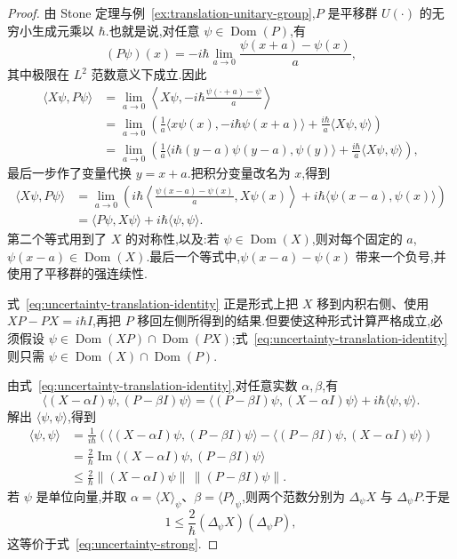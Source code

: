 \begin{proof}
由 Stone 定理与例~\ref{ex:translation-unitary-group},$P$ 是平移群 $U(\cdot)$ 的无穷小生成元乘以 $\hbar$.也就是说,对任意 $\psi\in\operatorname{Dom}(P)$,有
\[
(P\psi)(x)=-i\hbar\lim_{a\to0}\frac{\psi(x+a)-\psi(x)}{a},
\]
其中极限在 $L^2$ 范数意义下成立.因此
\begin{align}
\langle X\psi,P\psi\rangle
&=\lim_{a\to0}\left\langle X\psi,-i\hbar\frac{\psi(\cdot+a)-\psi}{a}\right\rangle\\
&=\lim_{a\to0}\left(\frac1a\langle x\psi(x),-i\hbar\psi(x+a)\rangle
+\frac{i\hbar}{a}\langle X\psi,\psi\rangle\right)\\
&=\lim_{a\to0}\left(\frac1a\langle i\hbar(y-a)\psi(y-a),\psi(y)\rangle
+\frac{i\hbar}{a}\langle X\psi,\psi\rangle\right),
\end{align}
最后一步作了变量代换 $y=x+a$.把积分变量改名为 $x$,得到
\begin{align}
\langle X\psi,P\psi\rangle
&=\lim_{a\to0}\left(i\hbar\left\langle\frac{\psi(x-a)-\psi(x)}a,X\psi(x)\right\rangle
+i\hbar\langle\psi(x-a),\psi(x)\rangle\right)\\
&=\langle P\psi,X\psi\rangle+i\hbar\langle\psi,\psi\rangle.
\label{eq:uncertainty-translation-identity}
\end{align}
第二个等式用到了 $X$ 的对称性,以及:若 $\psi\in\operatorname{Dom}(X)$,则对每个固定的 $a$,$\psi(x-a)\in\operatorname{Dom}(X)$.最后一个等式中,$\psi(x-a)-\psi(x)$ 带来一个负号,并使用了平移群的强连续性.

式~\eqref{eq:uncertainty-translation-identity} 正是形式上把 $X$ 移到内积右侧、使用 $XP-PX=i\hbar I$,再把 $P$ 移回左侧所得到的结果.但要使这种形式计算严格成立,必须假设 $\psi\in\operatorname{Dom}(XP)\cap\operatorname{Dom}(PX)$;式~\eqref{eq:uncertainty-translation-identity} 则只需 $\psi\in\operatorname{Dom}(X)\cap\operatorname{Dom}(P)$.

由式~\eqref{eq:uncertainty-translation-identity},对任意实数 $\alpha,\beta$,有
\[
\langle (X-\alpha I)\psi,(P-\beta I)\psi\rangle
=\langle(P-\beta I)\psi,(X-\alpha I)\psi\rangle+i\hbar\langle\psi,\psi\rangle.
\label{eq:uncertainty-shifted-inner-product}
\]
解出 $\langle\psi,\psi\rangle$,得到
\begin{align}
\langle\psi,\psi\rangle
&=\frac1{i\hbar}\left(\langle(X-\alpha I)\psi,(P-\beta I)\psi\rangle
-\langle(P-\beta I)\psi,(X-\alpha I)\psi\rangle\right)\\
&=\frac2\hbar\operatorname{Im}\langle(X-\alpha I)\psi,(P-\beta I)\psi\rangle\\
&\leq\frac2\hbar\|(X-\alpha I)\psi\|\,\|(P-\beta I)\psi\|.
\label{eq:uncertainty-strong-cauchy}
\end{align}
若 $\psi$ 是单位向量,并取 $\alpha=\langle X\rangle_\psi$、$\beta=\langle P\rangle_\psi$,则两个范数分别为 $\Delta_\psi X$ 与 $\Delta_\psi P$.于是
\[
1\leq\frac2\hbar(\Delta_\psi X)(\Delta_\psi P),
\]
这等价于式~\eqref{eq:uncertainty-strong}.
\end{proof}

